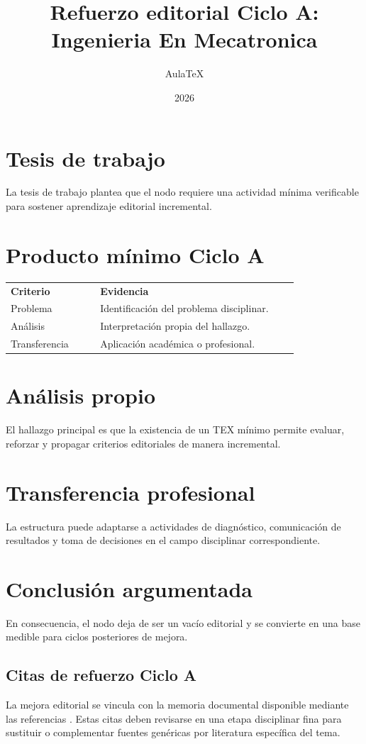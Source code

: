 \documentclass[spanish,letterpaper,oneside]{article}
\title{Refuerzo editorial Ciclo A: Ingenieria En Mecatronica}
\author{AulaTeX}
\date{2026}
\begin{document}
\maketitle
\section*{Tesis de trabajo}
La tesis de trabajo plantea que el nodo requiere una actividad mínima verificable para sostener aprendizaje editorial incremental.
\section*{Producto mínimo Ciclo A}
\begin{center}
\begin{tabular}{p{0.28\linewidth}p{0.62\linewidth}}
\textbf{Criterio} & \textbf{Evidencia}\\
Problema & Identificación del problema disciplinar.\\
Análisis & Interpretación propia del hallazgo.\\
Transferencia & Aplicación académica o profesional.\\
\end{tabular}
\end{center}
\section*{Análisis propio}
El hallazgo principal es que la existencia de un TEX mínimo permite evaluar, reforzar y propagar criterios editoriales de manera incremental.
\section*{Transferencia profesional}
La estructura puede adaptarse a actividades de diagnóstico, comunicación de resultados y toma de decisiones en el campo disciplinar correspondiente.
\section*{Conclusión argumentada}
En consecuencia, el nodo deja de ser un vacío editorial y se convierte en una base medible para ciclos posteriores de mejora.



\subsection*{Citas de refuerzo Ciclo A}
La mejora editorial se vincula con la memoria documental disponible mediante las referencias \citep{cicloARefuerzo01,cicloARefuerzo02,cicloARefuerzo03,cicloARefuerzo04,cicloARefuerzo05,cicloARefuerzo06}. Estas citas deben revisarse en una etapa disciplinar fina para sustituir o complementar fuentes genéricas por literatura específica del tema.
\end{document}
